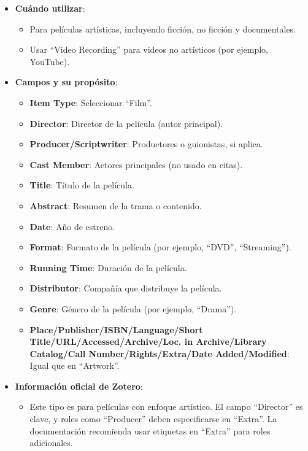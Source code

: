 \documentclass[
  jou,
  floatsintext,
  longtable,
  a4paper,
  nolmodern,
  notxfonts,
  notimes,
  12pt,
  colorlinks=true,linkcolor=blue,citecolor=blue,urlcolor=blue]{apa7}
\providecommand{\tightlist}{%
  \setlength{\itemsep}{0pt}\setlength{\parskip}{0pt}}
\begin{document}
\begin{itemize}
\tightlist
\item
  \textbf{Cuándo utilizar}:

  \begin{itemize}
  \tightlist
  \item
    Para películas artísticas, incluyendo ficción, no ficción y
    documentales.
  \item
    Usar ``Video Recording'' para videos no artísticos (por ejemplo,
    YouTube).
  \end{itemize}
\item
  \textbf{Campos y su propósito}:

  \begin{itemize}
  \tightlist
  \item
    \textbf{Item Type}: Seleccionar ``Film''.
  \item
    \textbf{Director}: Director de la película (autor principal).
  \item
    \textbf{Producer/Scriptwriter}: Productores o guionistas, si aplica.
  \item
    \textbf{Cast Member}: Actores principales (no usado en citas).
  \item
    \textbf{Title}: Título de la película.
  \item
    \textbf{Abstract}: Resumen de la trama o contenido.
  \item
    \textbf{Date}: Año de estreno.
  \item
    \textbf{Format}: Formato de la película (por ejemplo, ``DVD'',
    ``Streaming'').
  \item
    \textbf{Running Time}: Duración de la película.
  \item
    \textbf{Distributor}: Compañía que distribuye la película.
  \item
    \textbf{Genre}: Género de la película (por ejemplo, ``Drama'').
  \item
    \textbf{Place/Publisher/ISBN/Language/Short
    Title/URL/Accessed/Archive/Loc. in Archive/Library Catalog/Call
    Number/Rights/Extra/Date Added/Modified}: Igual que en ``Artwork''.
  \end{itemize}
\item
  \textbf{Información oficial de Zotero}:

  \begin{itemize}
  \tightlist
  \item
    Este tipo es para películas con enfoque artístico. El campo
    ``Director'' es clave, y roles como ``Producer'' deben especificarse
    en ``Extra''. La documentación recomienda usar etiquetas en
    ``Extra'' para roles adicionales.
  \end{itemize}
\end{itemize}
\end{document}
